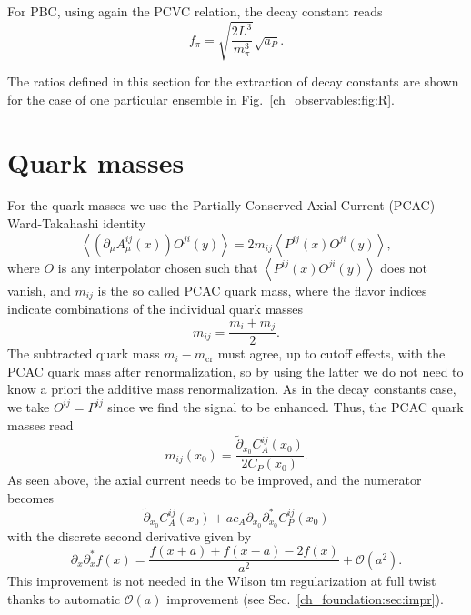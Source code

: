 For PBC, using again the PCVC relation, the decay constant reads
\begin{equation}
f_{\pi}=\sqrt{\frac{2L^3}{m_{\pi}^3}}\sqrt{a_P}.
\end{equation}

The ratios defined in this section for the extraction of decay constants are shown for the case of one particular ensemble in Fig.~\ref{ch_observables:fig:R}.


\section{Quark masses}
\label{ch_observables:sec:quark_mass}

For the quark masses we use the Partially Conserved Axial Current (PCAC) Ward-Takahashi identity
\begin{equation}
\label{ch_observables:eq:PCAC}
\left<\left(\partial_{\mu}A^{ij}_{\mu}(x)\right)O^{ji}(y)\right>=2m_{ij}\left<P^{ij}(x)O^{ji}(y)\right>,
\end{equation}
where $O$ is any interpolator chosen such that $\left<P^{ij}(x)O^{ji}(y)\right>$ does not vanish, and $m_{ij}$ is the so called PCAC quark mass, where the flavor indices indicate combinations of the individual quark masses
\begin{equation}
m_{ij}=\frac{m_i+m_{j}}{2}.
\end{equation}
The subtracted quark mass $m_{i}-m_{\textrm{cr}}$ must agree, up to cutoff effects, with the PCAC quark mass after renormalization, so by using the latter we do not need to know a priori the additive mass renormalization. As in the decay constants case, we take $O^{ij}=P^{ij}$ since we find the signal to be enhanced. Thus, the PCAC quark masses read
\begin{equation}
m_{ij}(x_0)=\frac{\tilde{\partial}_{x_0}C_A^{ij}(x_0)}{2C_P(x_0)}.
\end{equation}
As seen above, the axial current needs to be improved, and the numerator becomes
\begin{equation}
\tilde{\partial}_{x_0}C_A^{ij}(x_0)+ac_A\partial_{x_0}\partial^*_{x_0}C_P^{ij}(x_0)
\end{equation}
with the discrete second derivative given by
\begin{equation}
\partial_{x}\partial^*_xf(x)=\frac{f(x+a)+f(x-a)-2f(x)}{a^2}+\mathcal{O}(a^2).
\end{equation}
This improvement is not needed in the Wilson tm regularization at full twist thanks to automatic $\mathcal{O}(a)$ improvement (see Sec.~\ref{ch_foundation:sec:impr}).

